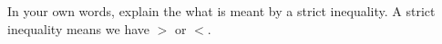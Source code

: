 {In your own words, explain the what is meant by a strict inequality.}
{A strict inequality means we have $>$ or $<$.}

